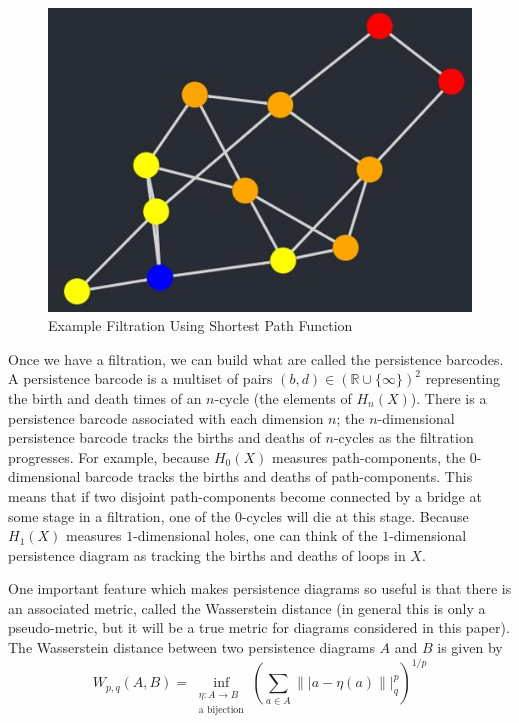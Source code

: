\documentclass[12pt,a4paper]{amsart}
\numberwithin{equation}{section}
\def\R{{\mathbb R}}
\theoremstyle{plain}
\theoremstyle{definition}
\begin{document}
\begin{figure}[h]
	\centering
	\includegraphics[scale=0.8]{ExampleFiltration.jpg}
	\caption{Example Filtration Using Shortest Path Function}
	\label{filtration}
\end{figure}

Once we have a filtration, we can build what are called the persistence barcodes. A persistence barcode is a multiset of pairs $(b,d) \in (\R \cup \{\infty\})^2$ representing the birth and death times of an $n$-cycle (the elements of $H_n(X)$).  There is a persistence barcode associated with each dimension $n$; the $n$-dimensional persistence barcode tracks the births and deaths of $n$-cycles as the filtration progresses. For example, because $H_0(X)$ measures path-components, the $0$-dimensional barcode tracks the births and deaths of path-components. This means that if two disjoint path-components become connected by a bridge at some stage in a filtration, one of the $0$-cycles will die at this stage. Because $H_1(X)$ measures $1$-dimensional holes, one can think of the $1$-dimensional persistence diagram as tracking the births and deaths of loops in $X$. 

One important feature which makes persistence diagrams so useful is that there is an associated metric, called the Wasserstein distance (in general this is only a pseudo-metric, but it will be a true metric for diagrams considered in this paper). The Wasserstein distance between two persistence diagrams $A$ and $B$ is given by
\[W_{p,q}(A,B)= \inf_{\substack{\eta: A \to B \\ \mbox{a bijection}}} \left(\sum_{a \in A} \|| a-\eta(a)\||^p_q \right)^{1/p} \]
\end{document}
